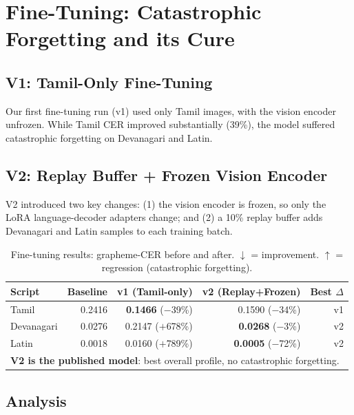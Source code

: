 \documentclass[11pt,a4paper]{article}
\begin{document}
\section{Fine-Tuning: Catastrophic Forgetting and its Cure}
\label{sec:finetune}

\subsection{V1: Tamil-Only Fine-Tuning}

Our first fine-tuning run (v1) used only Tamil images, with the vision encoder
unfrozen.
While Tamil CER improved substantially (39\%), the model suffered catastrophic
forgetting on Devanagari and Latin.

\subsection{V2: Replay Buffer + Frozen Vision Encoder}

V2 introduced two key changes:
(1) the vision encoder is frozen, so only the LoRA language-decoder adapters
    change; and
(2) a 10\% replay buffer adds Devanagari and Latin samples to each training
    batch.

\begin{table}[h]
\centering
\caption{Fine-tuning results: grapheme-CER before and after.
$\downarrow$ = improvement. $\uparrow$ = regression (catastrophic forgetting).}
\label{tab:ftresults}
\setlength{\tabcolsep}{6pt}
\begin{tabular}{lrrrr}
\toprule
Script & Baseline & v1 (Tamil-only) & v2 (Replay+Frozen) & Best $\Delta$ \\
\midrule
Tamil       & 0.2416 & \textbf{0.1466} ($-$39\%) & 0.1590 ($-$34\%) & v1 \\
Devanagari  & 0.0276 & 0.2147 (\textcolor{tamilred}{$+$678\%}) & \textbf{0.0268} ($-$3\%) & v2 \\
Latin       & 0.0018 & 0.0160 (\textcolor{tamilred}{$+$789\%}) & \textbf{0.0005} ($-$72\%) & v2 \\
\midrule
\multicolumn{5}{l}{\textbf{V2 is the published model}: best overall profile, no catastrophic forgetting.} \\
\bottomrule
\end{tabular}
\end{table}

\subsection{Analysis}
\end{document}
